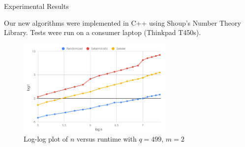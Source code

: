 \documentclass{beamer}
\begin{document}


    


\begin{frame}{Experimental Results}

Our new algorithms were implemented in C++ using Shoup's Number Theory Library. Tests were run on a consumer laptop (Thinkpad T450s).

\begin{figure}[h!]\label{fig:ntest499}
\centering
  \includegraphics[width=3in]{chart-499-2.png}
  \caption{Log-log plot of $n$ versus runtime with $q = 499$, $m = 2$}
\end{figure}
    
\end{frame}





\end{document}
